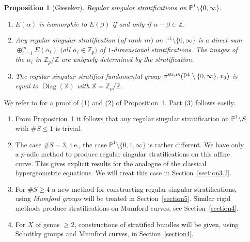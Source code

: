 \documentclass[10pt,a4paper]{amsart}
\numberwithin{equation}{section}
\newtheorem{Proposition}[Theorem]{Proposition}
\begin{document}
 \begin{Proposition}[Gieseker]\label{3.2} {\rm Regular singular stratifications on $\mathbb{P}^1\setminus \{0,\infty \} $}.
 \begin{enumerate}\itemsep=0pt
\item[$(1)$] $E(\alpha)$ is isomorphic to $E(\beta)$ if and only if $\alpha -\beta \in \mathbb{Z}$.
\item[$(2)$] Any regular singular stratification $($of rank~$m)$ on $\mathbb{P}^1\setminus \{0,\infty \}$ is a direct sum $\oplus_{i=1}^m E(\alpha _i)$ $($all $\alpha _i\in \mathbb{Z}_p)$ of $1$-dimensional stratifications. The images of the $\alpha_i$ in $\mathbb{Z}_p/\mathbb{Z}$ are uniquely determined by the stratification.
\item[$(3)$]The regular singular stratified fundamental group $\pi^{\rm str,rs}\big(\mathbb{P}^1\setminus \{0,\infty \},x_0\big)$ is equal to $\operatorname{Diag}(\mathbb{X})$ with
$\mathbb{X}=\mathbb{Z}_p/\mathbb{Z}$.
\end{enumerate}
 \end{Proposition}
 We refer to \cite[Section~4]{Gie} for a proof of (1) and (2) of Proposition~\ref{3.2}. Part (3) follows easily.

\begin{Remarks}\label{3.3}\quad
 \begin{enumerate}\itemsep=0pt
\item[(1)] From Proposition~\ref{3.2} it follows that any regular singular stratification on $\mathbb{P}^1\setminus S$ with $\#S\leq 1$ is trivial.
\item[(2)] The case $\# S=3$, i.e., the case $\mathbb{P}^1\setminus \{0,1,\infty \}$ is rather different. We have only a $p$-adic method to produce regular singular stratifications on this affine curve. This gives explicit results for the analogue of the classical hypergeometric equations. We will treat this case in Section~\ref{section3.2}.
\item[(3)] For $\# S\geq 4$ a new method for constructing regular singular stratifications, using {\it Mumford groups} will be treated in Section~\ref{section5}. Similar rigid methods produce stratifications on Mumford curves, see Section~\ref{section4}.
\item[(4)] For $X$ of genus $\geq 2$, constructions of stratified bundles will be given, using Schottky groups and Mumford curves, in Section~\ref{section4}.
\end{enumerate}
\end{Remarks}
\end{document}
